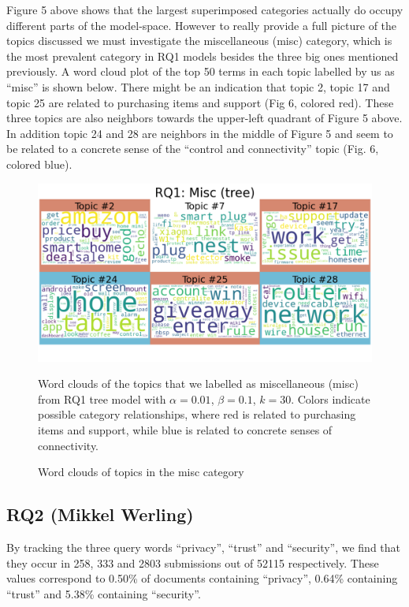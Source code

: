 \documentclass{article}
\begin{document}
Figure 5 above shows that the largest superimposed categories actually do occupy different parts of the model-space. However to really provide a full picture of the topics discussed we must investigate the miscellaneous (misc) category, which is the most prevalent category in RQ1 models besides the three big ones mentioned previously. A word cloud plot of the top 50 terms in each topic labelled by us as “misc” is shown below. There might be an indication that topic 2, topic 17 and topic 25 are related to purchasing items and support (Fig 6, colored red). These three topics are also neighbors towards the upper-left quadrant of Figure 5 above. In addition topic 24 and 28 are neighbors in the middle of Figure 5 and seem to be related to a concrete sense of the “control and connectivity” topic (Fig. 6, colored blue). 

\begin{figure}[H]
    \begin{centering}
    \includegraphics[width = \textwidth]{../Figure/tree_misc_red.png}
    \caption{Word clouds of topics in the misc category}
    \end{centering}
    \begin{footnotesize} 
        Word clouds of the topics that we labelled as miscellaneous (misc) from RQ1 tree model with $\alpha = 0.01$, $\beta = 0.1$, $k = 30$. Colors indicate possible category relationships, where red is related to purchasing items and support, while blue is related to concrete senses of connectivity. 
    \end{footnotesize}
\end{figure}

    \subsection{RQ2 (Mikkel Werling)}
    By tracking the three query words “privacy”, “trust” and “security”, we find that they occur in 258, 333 and 2803 submissions out of 52115 respectively. These values correspond to 0.50\% of documents containing “privacy”, 0.64\% containing “trust” and 5.38\% containing “security”. 
\end{document}
